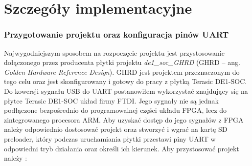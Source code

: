 \section{Szczegóły implementacyjne}
\label{sec:szczegoly-implementacyjne}



\subsubsection{Przygotowanie projektu oraz konfiguracja pinów UART}
Najwygodniejszym sposobem na rozpoczęcie projektu jest przystosowanie dołączonego przez producenta płytki projektu \textit{de1\_soc\_GHRD} (GHRD -- ang. \textit{Golden Hardware Reference Design}). GHRD jest projektem przeznaczonym do tego celu oraz jest skonfigurowany i gotowy do pracy z płytką Terasic DE1-SOC.
\break
Do kowersji sygnału USB do UART postanowiłem wykorzystać znajdujący się na płytce Terasic DE1-SOC układ firmy FTDI. Jego sygnały nie są jednak podłączone bezpośrednio do programowalnej części układu FPGA, lecz do zintegrowanego procesora ARM. Aby uzyskać dostęp do jego sygnałów z FPGA należy odpowiednio dostosować projekt oraz stworzyć i wgrać na kartę SD preloader, który podczas uruchamiania płytki przestawi piny UART w odpowiedni tryb działania oraz określi ich kierunek. Aby przystosować projekt należy \cite{altera-youtube-loanerio, altera-forum-fgga-hps-access, altera-forum-cant-rx}:
